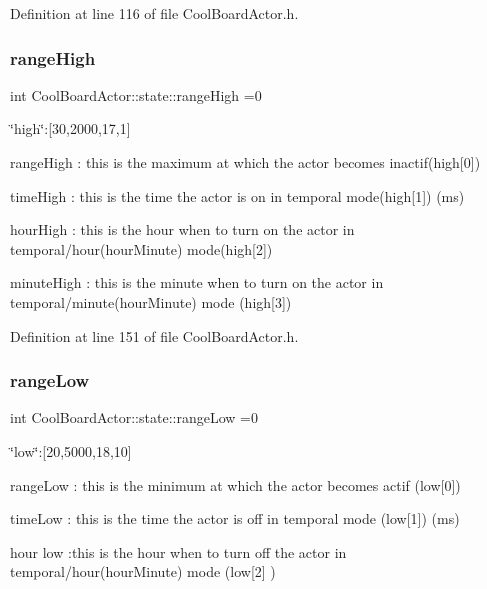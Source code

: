 Definition at line 116 of file Cool\+Board\+Actor.\+h.

\mbox{\label{struct_cool_board_actor_1_1state_a6e5cd6c5cd44e2decfd8d4df1853f8e3}} 
\subsubsection{\texorpdfstring{range\+High}{rangeHigh}}
{\footnotesize\ttfamily int Cool\+Board\+Actor\+::state\+::range\+High =0}

\char`\"{}high\char`\"{}\+:\mbox{[}30,2000,17,1\mbox{]}

range\+High \+: this is the maximum at which the actor becomes inactif(high\mbox{[}0\mbox{]})

time\+High \+: this is the time the actor is on in temporal mode(high\mbox{[}1\mbox{]}) (ms)

hour\+High \+: this is the hour when to turn on the actor in temporal/hour(hour\+Minute) mode(high\mbox{[}2\mbox{]})

minute\+High \+: this is the minute when to turn on the actor in temporal/minute(hour\+Minute) mode (high\mbox{[}3\mbox{]}) 

Definition at line 151 of file Cool\+Board\+Actor.\+h.

\mbox{\label{struct_cool_board_actor_1_1state_a43f891c9fb3bb63575c27cec860de55a}} 
\subsubsection{\texorpdfstring{range\+Low}{rangeLow}}
{\footnotesize\ttfamily int Cool\+Board\+Actor\+::state\+::range\+Low =0}

\char`\"{}low\char`\"{}\+:\mbox{[}20,5000,18,10\mbox{]}

range\+Low \+: this is the minimum at which the actor becomes actif (low\mbox{[}0\mbox{]})

time\+Low \+: this is the time the actor is off in temporal mode (low\mbox{[}1\mbox{]}) (ms)

hour low \+:this is the hour when to turn off the actor in temporal/hour(hour\+Minute) mode (low\mbox{[}2\mbox{]} )

